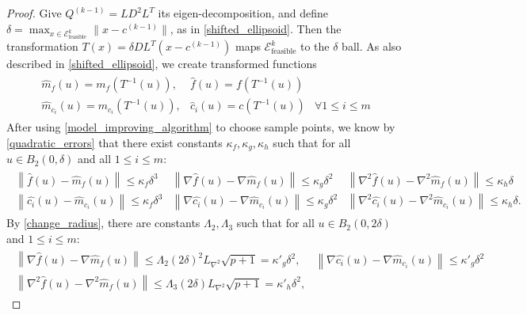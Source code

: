 \documentclass{article}
\theoremstyle{case}
\numberwithin{theorem}{subsection}
\newcommand{\liphess}{{L_{\nabla^2}}}
\newcommand{\unshiftedellipsoid}{{\mathcal E^k_{\textrm{feasible}}}}
\newcommand{\qkmo}{{Q^{(k-1)}}}
\newcommand{\ckmo}{{c^{(k-1)}}}
\begin{document}
\begin{proof}
Give $\qkmo = LD^2L^T$ its eigen-decomposition, and define $\delta = \max_{x \in \unshiftedellipsoid} \|x - \ckmo\|$, as in \cref{shifted_ellipsoid}.
Then the transformation $T(x) = \delta D L^T(x - \ckmo)$ maps $\unshiftedellipsoid$ to the $\delta$ ball.
As also described in \cref{shifted_ellipsoid}, we create transformed functions
\begin{align*}
\begin{array}{ccc}
\hat {m}_f(u) = m_f(T^{-1}(u)),&  \hat f (u) = f(T^{-1}(u)) &\\
\hat {m}_{c_i}(u) = m_{c_i}(T^{-1}(u)), &  \hat c_i (u) = c(T^{-1}(u))& \forall 1 \le i \le m
\end{array}
\end{align*}
After using \cref{model_improving_algorithm} to choose sample points, we know by \cref{quadratic_errors} that
there exist constants $\kappa_f, \kappa_g, \kappa_h$ such that for all $u \in B_2(0, \delta)$ and all $1\le i\le m$:
\begin{align*}
\begin{array}{ccc}
\left\| \hat {f}\left(u\right) -  \hat{m}_f\left(u\right) \right\|\le \kappa_f \delta^3 &
\left\|\nabla \hat {f}\left(u\right) - \nabla \hat{m}_f\left(u\right) \right\|\le \kappa_g \delta^2 &
\left\|\nabla^2 \hat {f}\left(u\right) - \nabla^2 \hat{m}_f\left(u\right) \right\|\le \kappa_h \delta \\
\left\| \hat {{c_i}}\left(u\right) -  \hat{m}_{c_i}\left(u\right) \right\|\le \kappa_f \delta^3 &
\left\|\nabla \hat {{c_i}}\left(u\right) - \nabla \hat{m}_{c_i}\left(u\right) \right\|\le \kappa_g \delta^2 &
\left\|\nabla^2 \hat {{c_i}}\left(u\right) - \nabla^2 \hat{m}_{c_i}\left(u\right) \right\|\le \kappa_h \delta.
\end{array}
\end{align*}
By \cref{change_radius}, there are constants $\Lambda_2, \Lambda_3$ such that for all $u \in B_2(0, 2\delta)$ and $1\le i\le m$:
\begin{align*}
\begin{array}{cc}
\left\|\nabla \hat {f}\left(u\right) - \nabla \hat{m}_f\left(u\right) \right\|\le \Lambda_2 \left(2\delta\right)^2 \liphess \sqrt{p+1} = {\kappa'}_g\delta^2, &
\left\|\nabla \hat {c_i}\left(u\right) - \nabla \hat{m}_{c_i}\left(u\right) \right\|\le {\kappa'}_g\delta^2 \\
\left\|\nabla^2 \hat {f}\left(u\right) - \nabla^2 \hat{m}_f\left(u\right) \right\|\le \Lambda_3 \left(2\delta\right) \liphess \sqrt{p+1} = {\kappa'}_h\delta^2, &

\end{array}
\end{align*}
\end{proof}
\end{document}
